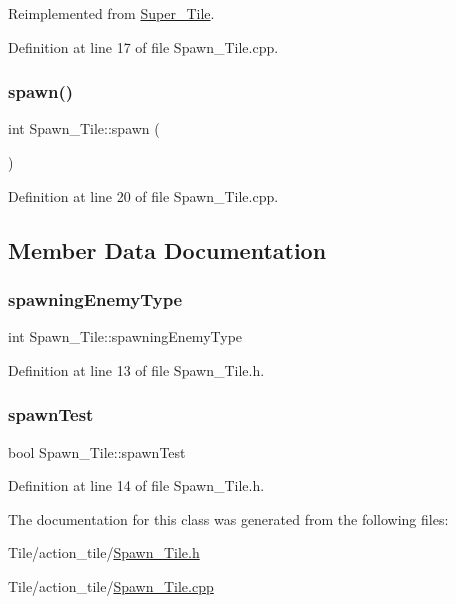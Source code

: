 Reimplemented from \hyperlink{class_super___tile_a7b509383d0d0ad2df0220f7dc4660823}{Super\+\_\+\+Tile}.



Definition at line 17 of file Spawn\+\_\+\+Tile.\+cpp.

\hypertarget{class_spawn___tile_a97168cfea2f8de79a6342c4b46d7eaf8}{}\label{class_spawn___tile_a97168cfea2f8de79a6342c4b46d7eaf8} 
\subsubsection{\texorpdfstring{spawn()}{spawn()}}
{\footnotesize\ttfamily int Spawn\+\_\+\+Tile\+::spawn (\begin{DoxyParamCaption}{ }\end{DoxyParamCaption})}



Definition at line 20 of file Spawn\+\_\+\+Tile.\+cpp.



\subsection{Member Data Documentation}
\hypertarget{class_spawn___tile_a43dfdce45bb37685e75666e3ec7331d1}{}\label{class_spawn___tile_a43dfdce45bb37685e75666e3ec7331d1} 
\subsubsection{\texorpdfstring{spawning\+Enemy\+Type}{spawningEnemyType}}
{\footnotesize\ttfamily int Spawn\+\_\+\+Tile\+::spawning\+Enemy\+Type}



Definition at line 13 of file Spawn\+\_\+\+Tile.\+h.

\hypertarget{class_spawn___tile_a3007d9023153c7b33a16398f4de74dc7}{}\label{class_spawn___tile_a3007d9023153c7b33a16398f4de74dc7} 
\subsubsection{\texorpdfstring{spawn\+Test}{spawnTest}}
{\footnotesize\ttfamily bool Spawn\+\_\+\+Tile\+::spawn\+Test}



Definition at line 14 of file Spawn\+\_\+\+Tile.\+h.



The documentation for this class was generated from the following files\+:\begin{DoxyCompactItemize}
\item 
Tile/action\+\_\+tile/\hyperlink{_spawn___tile_8h}{Spawn\+\_\+\+Tile.\+h}\item 
Tile/action\+\_\+tile/\hyperlink{_spawn___tile_8cpp}{Spawn\+\_\+\+Tile.\+cpp}\end{DoxyCompactItemize}
